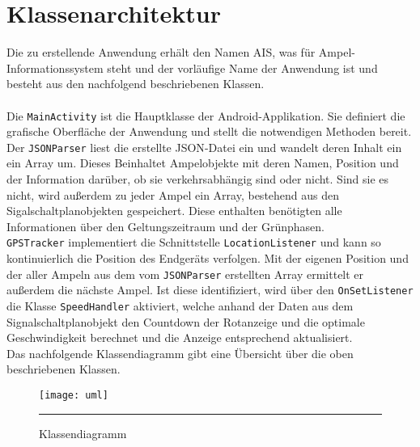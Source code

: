 \section{Klassenarchitektur}
Die zu erstellende Anwendung erhält den Namen AIS, was für Ampel-Informationssystem steht und der vorläufige Name der Anwendung ist und besteht aus den nachfolgend beschriebenen Klassen. \\\\
Die \texttt{MainActivity} ist die Hauptklasse der Android-Applikation. Sie definiert die grafische Oberfläche der Anwendung und stellt die notwendigen Methoden bereit. \\
Der \texttt{\gls{JSON}Parser} liest die erstellte \gls{JSON}-Datei ein und wandelt deren Inhalt ein ein Array um. Dieses Beinhaltet Ampelobjekte mit deren Namen, Position und der Information darüber, ob sie verkehrsabhängig sind oder nicht. Sind sie es nicht, wird außerdem zu jeder Ampel ein Array, bestehend aus den Sigalschaltplanobjekten gespeichert. Diese enthalten benötigten alle Informationen über den Geltungszeitraum und der Grünphasen.\\ 
\texttt{GPSTracker} implementiert die Schnittstelle \texttt{LocationListener} und kann so kontinuierlich die Position des Endgeräts verfolgen. Mit der eigenen Position und der aller Ampeln aus dem vom \texttt{JSONParser} erstellten Array ermittelt er außerdem die nächste Ampel. Ist diese identifiziert, wird über den \texttt{OnSetListener} die Klasse \texttt{SpeedHandler} aktiviert, welche anhand der Daten aus dem Signalschaltplanobjekt den Countdown der Rotanzeige und die optimale Geschwindigkeit berechnet und die Anzeige entsprechend aktualisiert. \\
Das nachfolgende Klassendiagramm gibt eine Übersicht über die oben beschriebenen Klassen.
\begin{figure}[H]  
    \centering  
    \texttt{[image: uml]} 
    \rule{35em}{0.5pt}
    \caption{Klassendiagramm}
    \label{fig:uml}
\end{figure}
